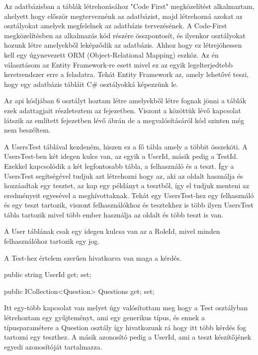 




Az adatbázisban a táblák létrehozásához "Code First" megközelítést alkalmaztam, ahelyett hogy először megterveznénk az adatbázist, majd létrehozná azokat az osztályokat amelyek megfelelnek az adatbázis tervezésének. A Code-First megközelítésben az alkalmazás kód részére összpontosít, és ilyenkor osztályokat hozunk létre amelyekből leképződik az adatbázis. Ahhoz hogy ez létrejöhessen kell egy úgynevezett ORM (Object-Relational Mapping) eszköz. Az én választásom az Entity Framework-re esett mivel ez az egyik legelterjedtebb keretrendszer erre a feladatra. Tehát Entity Framework az, amely lehetővé teszi, hogy egy adatbázis tábláit C\# osztályokká képezzünk le. \bigskip

Az api kódjában 6 osztályt hoztam létre amelyekből létre fognak jönni a táblák ezek adattagjait részleteztem az  fejezetben.
Viszont a közöttük lévő kapcsolat látszik az említett fejezetben lévő ábrán de a megvalósításáról kód szinten még nem beszéltem. \bigskip

A UsersTest táblával kezdeném, hiszen ez a fő tábla amely a többit összeköti.
A UsersTest-ben két idegen kulcs van, az egyik a UserId, másik pedig a TestId. Ezekkel kapcsolódik a két legfontosabb tábla, a felhasználó és a teszt. Így a UsersTest segítségével tudjuk azt létrehozni hogy az, aki az oldalt használja és hozzáadtak egy tesztet, az kap egy példányt a tesztből, így el tudjuk menteni az eredményeit egyesével a meghívottaknak.
Tehát egy UsersTest-hez egy felhasználó és egy teszt tartozik, viszont felhasználókhoz és tesztekhez is több ilyen UsersTest tábla tartozik mivel több ember használja az oldalt és több teszt is van. \bigskip


A User táblának csak egy idegen kulcsa van az a RoleId, mivel minden felhasználóhoz tartozik egy jog. \bigskip


A Test-hez értelem szerűen hivatkozva van maga a kérdés.
\begin{cpp}
    public string UserId { get; set; }

    public ICollection<Question> Questions { get; set; }
\end{cpp}
Itt egy-több kapcsolat van melyet úgy valósítottam meg hogy a Test osztályban létrehoztam egy gyűjteményt, ami egy generikus típus, és ennek a típusparamétere a Question osztály így hivatkozunk rá hogy itt több kérdés fog tartozni egy teszthez. A másik azonosító pedig a UserId, ami a teszt készítőjének egyedi azonosítóját tartalmazza. \bigskip

